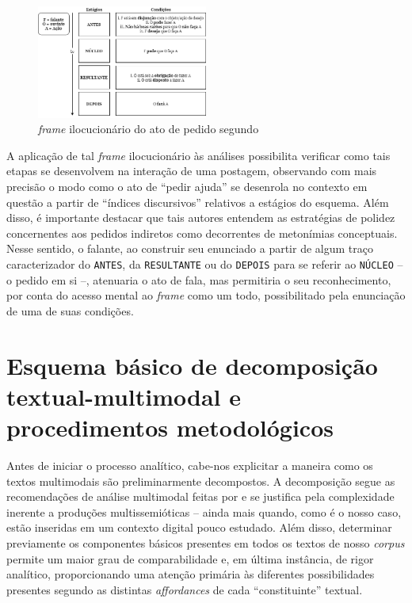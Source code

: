 \documentclass{textolivre-html}
\begin{document}
\begin{figure}[htbp]
 \centering
 \includegraphics[width=0.5\textwidth]{fig01}
 \caption{\textit{frame} ilocucionário do ato de pedido segundo \textcite{panther2017}\protect\footnotemark}
 \label{fig01}
\end{figure}

A aplicação de tal \textit{frame} ilocucionário às análises possibilita verificar como tais etapas se desenvolvem na interação de uma postagem, observando com mais precisão o modo como o ato de “pedir ajuda” se desenrola no contexto em questão a partir de “índices discursivos” relativos a estágios do esquema. Além disso, é importante destacar que tais autores entendem as estratégias de polidez concernentes aos pedidos indiretos como decorrentes de metonímias conceptuais. Nesse sentido, o falante, ao construir seu enunciado a partir de algum traço caracterizador do \texttt{ANTES}, da \texttt{RESULTANTE} ou do \texttt{DEPOIS} para se referir ao \texttt{NÚCLEO} -- o pedido em si --, atenuaria o ato de fala, mas permitiria o seu reconhecimento, por conta do acesso mental ao \textit{frame} como um todo, possibilitado pela enunciação de uma de suas condições.

\section{Esquema básico de decomposição textual-multimodal e procedimentos metodológicos}\label{sec-esquema}

Antes de iniciar o processo analítico, cabe-nos explicitar a maneira como os textos multimodais são preliminarmente decompostos. A decomposição segue as recomendações de análise multimodal feitas por \textcite{bateman2017} e se justifica pela complexidade inerente a produções multissemióticas – ainda mais quando, como é o nosso caso, estão inseridas em um contexto digital pouco estudado. Além disso, determinar previamente os componentes básicos presentes em todos os textos de nosso \textit{corpus} permite um maior grau de comparabilidade e, em última instância, de rigor analítico, proporcionando uma atenção primária às diferentes possibilidades presentes segundo as distintas \textit{affordances} de cada “constituinte” textual.
\end{document}

